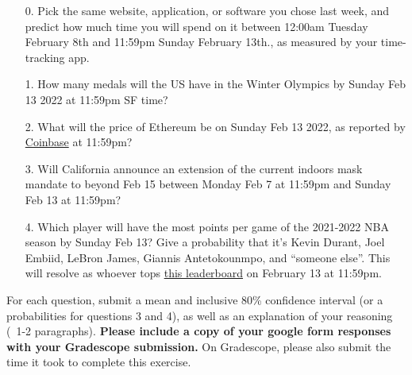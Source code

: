 \documentclass[11pt]{article}
\begin{document}
\begin{enumerate}
	\item[0.] Pick the same website, application, or software you chose last week, and predict how much time you will spend on it between 12:00am Tuesday February 8th and 11:59pm Sunday February 13th., as measured by your time-tracking app.

	\item[1.] How many medals will the US have in the Winter Olympics by Sunday Feb 13 2022 at 11:59pm SF time?
	
	\item[2.] What will the price of Ethereum be on Sunday Feb 13 2022, as reported by \href{https://www.coinbase.com/price/ethereum}{Coinbase} at 11:59pm?
 
	\item[3.] Will California announce an extension of the current indoors mask mandate to beyond Feb 15 between Monday Feb 7 at 11:59pm and Sunday Feb 13 at 11:59pm?
	
	\item[4.] Which player will have the most points per game of the 2021-2022 NBA season by Sunday Feb 13? Give a probability that it's Kevin Durant, Joel Embiid, LeBron James, Giannis Antetokounmpo, and ``someone else''. This will resolve as whoever tops \href{https://www.nba.com/stats/players/traditional/?sort=PTS&dir=-1&Season=2021-22&SeasonType=Regular%20Season}{this leaderboard} on February 13 at 11:59pm.
\end{enumerate}

For each question, submit a mean and inclusive 80\% confidence interval (or a probabilities for questions 3 and 4), as well as an explanation of your reasoning (~1-2 paragraphs). \textbf{Please include a copy of your google form responses with your Gradescope submission.} On Gradescope, please also submit the time it took to complete this exercise.
\end{document}
